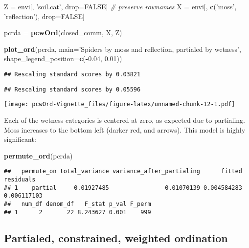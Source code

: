 \documentclass[
]{article}
\newenvironment{Shaded}{\begin{snugshade}}{\end{snugshade}}
\newcommand{\CommentTok}[1]{\textcolor[rgb]{0.56,0.35,0.01}{\textit{#1}}}
\newcommand{\DataTypeTok}[1]{\textcolor[rgb]{0.13,0.29,0.53}{#1}}
\newcommand{\FloatTok}[1]{\textcolor[rgb]{0.00,0.00,0.81}{#1}}
\newcommand{\KeywordTok}[1]{\textcolor[rgb]{0.13,0.29,0.53}{\textbf{#1}}}
\newcommand{\NormalTok}[1]{#1}
\newcommand{\OperatorTok}[1]{\textcolor[rgb]{0.81,0.36,0.00}{\textbf{#1}}}
\newcommand{\OtherTok}[1]{\textcolor[rgb]{0.56,0.35,0.01}{#1}}
\newcommand{\StringTok}[1]{\textcolor[rgb]{0.31,0.60,0.02}{#1}}
\begin{document}
\begin{Shaded}
\begin{Highlighting}[]
\NormalTok{Z =}\StringTok{ }\NormalTok{envi[, }\StringTok{'soil.cat'}\NormalTok{, drop=}\OtherTok{FALSE}\NormalTok{] }\CommentTok{# preserve rownames}
\NormalTok{X =}\StringTok{ }\NormalTok{envi[, }\KeywordTok{c}\NormalTok{(}\StringTok{'moss'}\NormalTok{, }\StringTok{'reflection'}\NormalTok{), drop=}\OtherTok{FALSE}\NormalTok{]}

\NormalTok{pcrda =}\StringTok{ }\KeywordTok{pcwOrd}\NormalTok{(closed_comm, X, Z)}

\KeywordTok{plot_ord}\NormalTok{(pcrda, }
         \DataTypeTok{main=}\StringTok{'Spiders by moss and reflection, partialed by wetness'}\NormalTok{, }
         \DataTypeTok{shape_legend_position=}\KeywordTok{c}\NormalTok{(}\OperatorTok{-}\FloatTok{0.04}\NormalTok{, }\FloatTok{0.01}\NormalTok{))}
\end{Highlighting}
\end{Shaded}

\begin{verbatim}
## Rescaling standard scores by 0.03821
\end{verbatim}

\begin{verbatim}
## Rescaling standard scores by 0.05596
\end{verbatim}

\texttt{[image: pcwOrd-Vignette\_files/figure-latex/unnamed-chunk-12-1.pdf]}

Each of the wetness categories is centered at zero, as expected due to
partialing. Moss increases to the bottom left (darker red, and arrows).
This model is highly significant:

\begin{Shaded}
\begin{Highlighting}[]
\KeywordTok{permute_ord}\NormalTok{(pcrda)}
\end{Highlighting}
\end{Shaded}

\begin{verbatim}
##   permute_on total_variance variance_after_partialing      fitted   residuals
## 1    partial     0.01927485                0.01070139 0.004584283 0.006117103
##   num_df denom_df   F_stat p_val F_perm
## 1      2       22 8.243627 0.001    999
\end{verbatim}

\hypertarget{partialed-constrained-weighted-ordination}{%
\subsection{Partialed, constrained, weighted
ordination}\label{partialed-constrained-weighted-ordination}}
\end{document}
